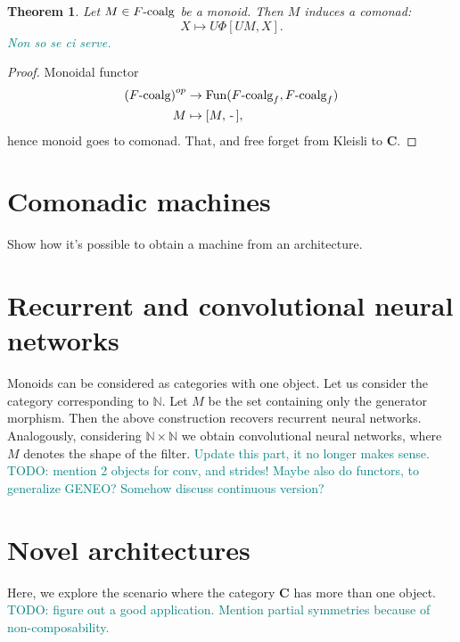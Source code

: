 \documentclass[12pt]{article}
\newtheorem{theorem}{Theorem}
\newcommand{\pietro}[1]{\textcolor{teal}{#1}}
\newcommand{\N}{{\mathbb{N}}}
\newcommand{\Fun}{{\textnormal{Fun}}}
\newcommand{\Cat}{{\mathbf{C}}}
\newcommand{\Coalg}{{F\textnormal{-coalg}}}
\newcommand{\FreeCoalg}{{F\textnormal{-coalg}_f}}
\newcommand{\anon}{{\,\mbox{-}\,}}
\begin{document}
\begin{theorem}\label{thm:weight_sharing}
    Let $M \in \Coalg$ be a monoid. Then $M$ induces a comonad:
    \begin{equation*}
        X \mapsto U\Phi[UM, X].
    \end{equation*}
    \pietro{Non so se ci serve.}
\end{theorem}

\begin{proof}
    Monoidal functor
    \begin{align*}
        \left(\Coalg\right)^{op} & \rightarrow \Fun(\FreeCoalg, \FreeCoalg) \\
        M                        & \mapsto [M, \anon],
    \end{align*}
    hence monoid goes to comonad. That, and free forget from Kleisli to $\Cat$.
\end{proof}

\section{Comonadic machines}

Show how it's possible to obtain a machine from an architecture.

\section{Recurrent and convolutional neural networks}

Monoids can be considered as categories with one object. Let us consider the category corresponding to $\N$. Let $M$ be the set containing only the generator morphism. Then the above construction recovers recurrent neural networks. Analogously, considering $\N \times \N$ we obtain convolutional neural networks, where $M$ denotes the shape of the filter. \pietro{Update this part, it no longer makes sense.}
\pietro{TODO: mention 2 objects for conv, and strides!}
\pietro{Maybe also do functors, to generalize GENEO? Somehow discuss continuous version?}

\section{Novel architectures}

Here, we explore the scenario where the category $\Cat$ has more than one object.
\pietro{TODO: figure out a good application.}
\pietro{Mention partial symmetries because of non-composability.}



\end{document}
